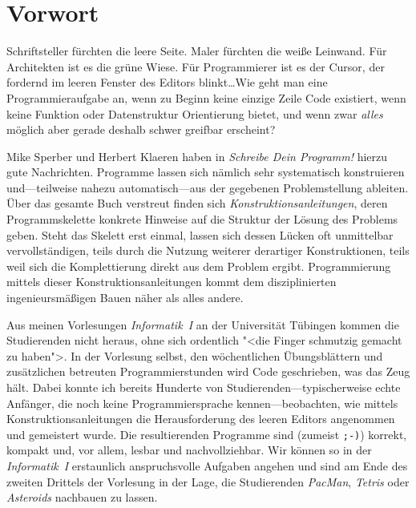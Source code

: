 
\chapter*{Vorwort}
\thispagestyle{empty}


Schriftsteller fürchten die leere Seite.  Maler fürchten die weiße
Leinwand.  Für Architekten ist es die grüne Wiese.  Für Programmierer
ist es der Cursor, der fordernd im leeren Fenster des Editors
blinkt\dots Wie geht man eine Programmieraufgabe an, wenn zu Beginn
keine einzige Zeile Code existiert, wenn keine Funktion oder
Datenstruktur Orientierung bietet, und wenn zwar \emph{alles} möglich
aber gerade deshalb schwer greifbar erscheint?

Mike Sperber und Herbert Klaeren haben in \textit{Schreibe Dein
Programm!} hierzu gute Nachrichten.  Programme lassen sich nämlich sehr
systematisch konstruieren und---teilweise nahezu auto\-ma\-tisch---aus der
gegebenen Problemstellung ableiten.  Über das gesamte Buch verstreut
finden sich \textit{Konstruktionsanleitungen}, deren Programmskelette
konkrete Hinweise auf die Struktur der Lösung des Problems geben.  Steht
das Skelett erst einmal, lassen sich dessen Lücken oft unmittelbar
vervollständigen, teils durch die Nutzung weiterer derartiger
Konstruktionen, teils weil sich die Komplettierung direkt aus dem
Problem ergibt.  Programmierung mittels dieser Konstruktionsanleitungen
kommt dem disziplinierten ingenieursmäßigen Bauen näher als alles
andere.

Aus meinen Vorlesungen \textit{Informatik~I} an der Universität Tübingen
kommen die Studierenden nicht heraus, ohne sich ordentlich "<die Finger
schmutzig gemacht zu haben">.  In der Vorlesung selbst, den
wöchentlichen Übungsblättern und zusätzlichen betreuten
Programmierstunden wird Code geschrieben, was das Zeug hält.  Dabei
konnte ich bereits Hunderte von Studierenden---typischerweise echte
Anfänger, die noch keine Programmiersprache kennen---beobachten, wie
mittels Konstruktionsanleitungen die Herausforderung des leeren Editors
angenommen und gemeistert wurde.  Die resultierenden Programme sind
(zumeist \texttt{;-)}) korrekt, kompakt und, vor allem, lesbar und
nachvollziehbar.  Wir können so in der \textit{Informatik~I} erstaunlich
anspruchsvolle Aufgaben angehen und sind am Ende des zweiten
Drittels der Vorlesung in der Lage, die Studierenden \textit{PacMan},
\textit{Tetris} oder \textit{Asteroids} nachbauen zu lassen.

